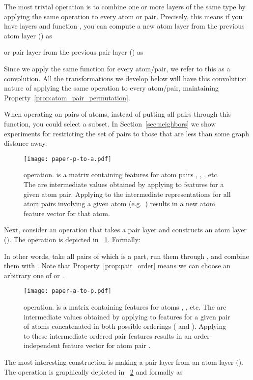 The most trivial operation is to combine one or more layers of the same type
by applying the same operation to every atom or pair. Precisely, this
means if you have layers  and function , you can compute
a new atom layer from the previous atom layer () as

or pair layer from the previous pair layer () as

Since we apply the same function for every atom/pair, we refer to this as a
convolution. All the transformations we develop below will have this convolution
nature of applying the same operation to every atom/pair, maintaining
Property~\ref{prop:atom_pair_permutation}.

When operating on pairs of atoms, instead of putting all pairs through
this function, you could select a subset. In
Section~\ref{sec:neighbors} we show experiments for restricting the
set of pairs to those that are less than some graph distance away.

\begin{figure}[tb]
\centering
  \texttt{[image: paper-p-to-a.pdf]}
  \caption{ operation.  is a matrix containing features
  for atom pairs , , , etc. The  are intermediate values
  obtained by applying  to features for a given atom pair. Applying  to
  the intermediate representations for all atom pairs involving a given atom
  (e.g.~) results in a new atom feature vector for that atom.}
  \label{fig:p-to-a}
\end{figure}

Next, consider an operation that takes a pair layer  and constructs an atom
layer  (). The operation is depicted in
\figurename~\ref{fig:p-to-a}. Formally:

In other words, take all pairs of which  is a part, run them through , and
combine them with . Note that Property~\ref{prop:pair_order} means we can
choose an arbitrary one of  or .

\begin{figure}[tb]
\centering
  \texttt{[image: paper-a-to-p.pdf]}
  \caption{ operation.  is a matrix containing features
  for atoms , , etc. The  are intermediate values obtained by
  applying  to features for a given pair of atoms concatenated in both
  possible orderings ( and ). Applying  to these intermediate ordered
  pair features results in an order-independent feature vector for atom pair
  .}
  \label{fig:a-to-p}
\end{figure}
The most interesting construction is making a pair layer from an atom
layer (). The operation is graphically depicted in
\figurename~\ref{fig:a-to-p} and formally as

